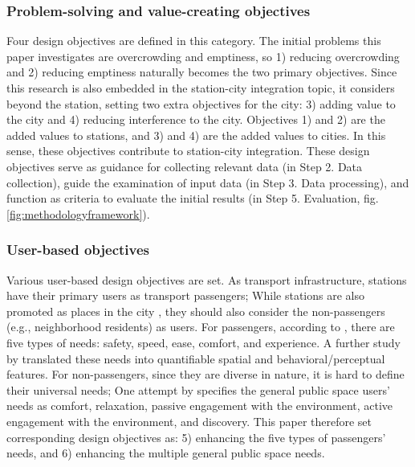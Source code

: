 \documentclass[]{article}
\begin{document}
\subsubsection{Problem-solving and value-creating objectives}
\label{Problem-solving and value-creating objectives}
Four design objectives are defined in this category. The initial problems this paper investigates are overcrowding and emptiness, so 1) reducing overcrowding and 2) reducing emptiness naturally becomes the two primary objectives. Since this research is also embedded in the station-city integration topic, it considers beyond the station, setting two extra objectives for the city: 3) adding value to the city and 4) reducing interference to the city. Objectives 1) and 2) are the added values to stations, and 3) and 4) are the added values to cities. In this sense, these objectives contribute to station-city integration. These design objectives serve as guidance for collecting relevant data (in Step 2. Data collection), guide the examination of input data (in Step 3. Data processing), and function as criteria to evaluate the initial results (in Step 5. Evaluation, fig. \ref{fig:methodologyframework}).

\subsubsection{User-based objectives}
\label{User-based objectives}
Various user-based design objectives are set. As transport infrastructure, stations have their primary users as transport passengers; While stations are also promoted as places in the city \citep{bertoliniCitiesRailsRedevelopment1998}, they should also consider the non-passengers (e.g., neighborhood residents) as users. For passengers, according to \citet{vanhagenWaitingExperienceTrain2011}, there are five types of needs: safety, speed, ease, comfort, and experience. A further study by \citet{chenEvaluateUserSatisfaction2024} translated these needs into quantifiable spatial and behavioral/perceptual features. For non-passengers, since they are diverse in nature, it is hard to define their universal needs; One attempt by \citet{carrPublicSpace1992a} specifies the general public space users' needs as comfort, relaxation, passive engagement with the environment, active engagement with the environment, and discovery. This paper therefore set corresponding design objectives as: 5) enhancing the five types of passengers’ needs, and 6) enhancing the multiple general public space needs.
\end{document}
